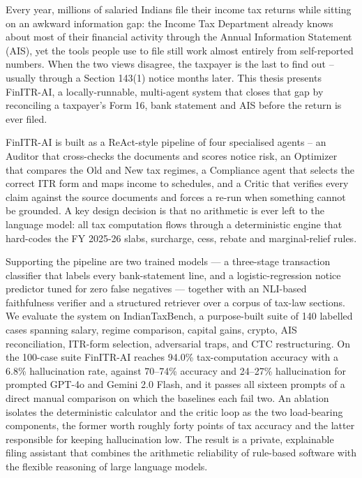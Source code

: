 
Every year, millions of salaried Indians file their income tax returns while
sitting on an awkward information gap: the Income Tax Department already knows
about most of their financial activity through the Annual Information Statement
(AIS), yet the tools people use to file still work almost entirely from
self-reported numbers. When the two views disagree, the taxpayer is the last to
find out -- usually through a Section 143(1) notice months later. This thesis
presents FinITR-AI, a locally-runnable, multi-agent system that closes that gap
by reconciling a taxpayer's Form 16, bank statement and AIS before the return is
ever filed.

FinITR-AI is built as a ReAct-style pipeline of four specialised agents -- an
Auditor that cross-checks the documents and scores notice risk, an Optimizer
that compares the Old and New tax regimes, a Compliance agent that selects the
correct ITR form and maps income to schedules, and a Critic that verifies every
claim against the source documents and forces a re-run when something cannot be
grounded. A key design decision is that no arithmetic is ever left to the
language model: all tax computation flows through a deterministic engine that
hard-codes the FY 2025-26 slabs, surcharge, cess, rebate and marginal-relief
rules.

Supporting the pipeline are two trained models --- a three-stage transaction
classifier that labels every bank-statement line, and a logistic-regression
notice predictor tuned for zero false negatives --- together with an NLI-based
faithfulness verifier and a structured retriever over a corpus of tax-law
sections. We evaluate the system on IndianTaxBench, a purpose-built suite of 140
labelled cases spanning salary, regime comparison, capital gains, crypto, AIS
reconciliation, ITR-form selection, adversarial traps, and CTC restructuring. On
the 100-case suite FinITR-AI reaches 94.0\% tax-computation accuracy with a 6.8\%
hallucination rate, against 70--74\% accuracy and 24--27\% hallucination for
prompted GPT-4o and Gemini 2.0 Flash, and it passes all sixteen prompts of a
direct manual comparison on which the baselines each fail two. An ablation
isolates the deterministic calculator and the critic loop as the two
load-bearing components, the former worth roughly forty points of tax accuracy
and the latter responsible for keeping hallucination low. The result is a
private, explainable filing assistant that combines the arithmetic reliability
of rule-based software with the flexible reasoning of large language models.
